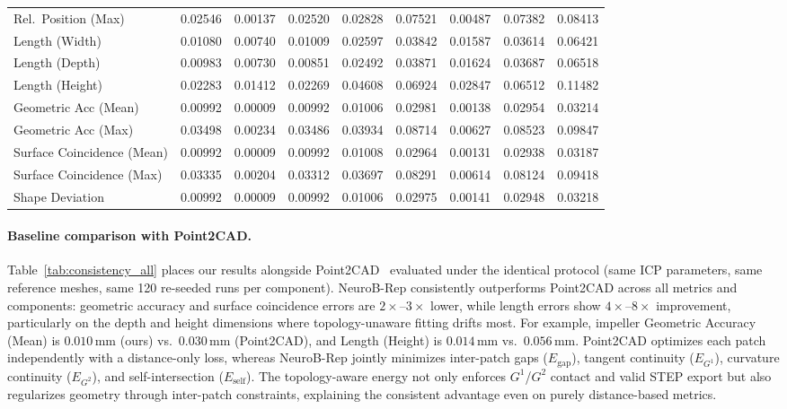 \documentclass{ieeeaccess}
\begin{document}
\begin{table}[t]
\begin{tabular}{
      >{\raggedright\arraybackslash}p{3.0cm}
      S S S S
      S S S S
  }
    Rel.\ Position (Max)     & 0.02546 & 0.00137 & 0.02520 & 0.02828  & 0.07521 & 0.00487 & 0.07382 & 0.08413 \\
    Length (Width)            & 0.01080 & 0.00740 & 0.01009 & 0.02597  & 0.03842 & 0.01587 & 0.03614 & 0.06421 \\
    Length (Depth)            & 0.00983 & 0.00730 & 0.00851 & 0.02492  & 0.03871 & 0.01624 & 0.03687 & 0.06518 \\
    Length (Height)           & 0.02283 & 0.01412 & 0.02269 & 0.04608  & 0.06924 & 0.02847 & 0.06512 & 0.11482 \\
    Geometric Acc (Mean)      & 0.00992 & 0.00009 & 0.00992 & 0.01006  & 0.02981 & 0.00138 & 0.02954 & 0.03214 \\
    Geometric Acc (Max)       & 0.03498 & 0.00234 & 0.03486 & 0.03934  & 0.08714 & 0.00627 & 0.08523 & 0.09847 \\
    Surface Coincidence (Mean)& 0.00992 & 0.00009 & 0.00992 & 0.01008  & 0.02964 & 0.00131 & 0.02938 & 0.03187 \\
    Surface Coincidence (Max) & 0.03335 & 0.00204 & 0.03312 & 0.03697  & 0.08291 & 0.00614 & 0.08124 & 0.09418 \\
    Shape Deviation           & 0.00992 & 0.00009 & 0.00992 & 0.01006  & 0.02975 & 0.00141 & 0.02948 & 0.03218 \\
    \bottomrule
  \end{tabular}
\end{table}

\paragraph*{Baseline comparison with Point2CAD.}
Table~\ref{tab:consistency_all} places our results alongside Point2CAD~\cite{b2}
evaluated under the identical protocol (same ICP parameters, same reference meshes,
same 120 re-seeded runs per component).
NeuroB-Rep consistently outperforms Point2CAD across all metrics and components:
geometric accuracy and surface coincidence errors are $2{\times}$--$3{\times}$ lower,
while length errors show $4{\times}$--$8{\times}$ improvement, particularly on
the depth and height dimensions where topology-unaware fitting drifts most.
For example, impeller Geometric Accuracy (Mean) is $0.010$\,mm (ours) vs.\
$0.030$\,mm (Point2CAD), and Length (Height) is $0.014$\,mm vs.\ $0.056$\,mm.
Point2CAD optimizes each patch independently with a distance-only loss,
whereas NeuroB-Rep jointly minimizes inter-patch gaps ($E_{\mathrm{gap}}$),
tangent continuity ($E_{G^1}$), curvature continuity ($E_{G^2}$),
and self-intersection ($E_{\mathrm{self}}$).
The topology-aware energy not only enforces $G^1$/$G^2$ contact and
valid STEP export but also regularizes geometry through inter-patch
constraints, explaining the consistent advantage even on purely
distance-based metrics.
\end{document}
